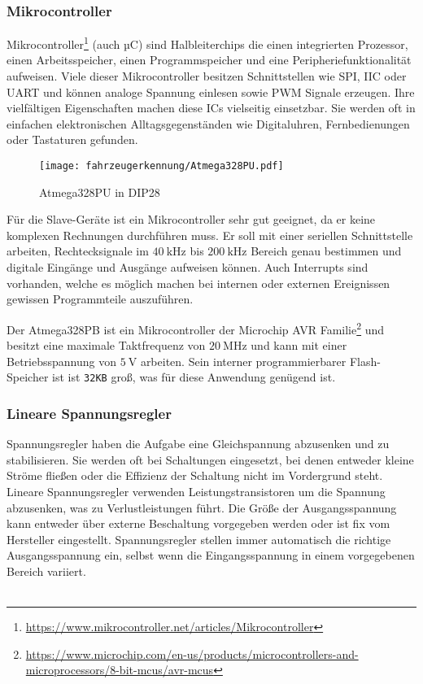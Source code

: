 \subsubsection{Mikrocontroller}

Mikrocontroller\footnote{\url{https://www.mikrocontroller.net/articles/Mikrocontroller}} (auch µC) sind Halbleiterchips die einen integrierten Prozessor, einen Arbeitsspeicher, einen Programmspeicher und eine Peripheriefunktionalität aufweisen. Viele dieser Mikrocontroller besitzen Schnittstellen wie SPI, IIC oder UART
und können analoge Spannung einlesen sowie PWM Signale erzeugen. Ihre vielfältigen Eigenschaften machen diese ICs vielseitig einsetzbar. Sie werden oft in einfachen elektronischen Alltagsgegenständen wie Digitaluhren, Fernbedienungen oder Tastaturen gefunden. 

\begin{figure}[H]
    \centering
    \texttt{[image: fahrzeugerkennung/Atmega328PU.pdf]}
    \caption{Atmega328PU in DIP28}
\end{figure}

Für die Slave-Geräte ist ein Mikrocontroller sehr gut geeignet, da er keine komplexen Rechnungen durchführen muss. Er soll mit einer seriellen Schnittstelle arbeiten, Rechtecksignale im $\SI{40}{\kilo\hertz}$ bis $\SI{200}{\kilo\hertz}$ Bereich genau bestimmen und
digitale Eingänge und Ausgänge aufweisen können. Auch Interrupts sind vorhanden, welche es möglich machen bei internen oder externen Ereignissen gewissen Programmteile auszuführen.



Der Atmega328PB ist ein Mikrocontroller der Microchip AVR Familie\footnote{\url{https://www.microchip.com/en-us/products/microcontrollers-and-microprocessors/8-bit-mcus/avr-mcus}} und besitzt eine maximale Taktfrequenz von $\SI{20}{\mega\hertz}$ und kann mit einer Betriebsspannung von $\SI{5}{\volt}$ arbeiten.
Sein interner programmierbarer Flash-Speicher ist ist \texttt{32KB} groß, was für diese Anwendung genügend ist.

\subsubsection{Lineare Spannungsregler}

Spannungsregler haben die Aufgabe eine Gleichspannung abzusenken und zu stabilisieren. Sie werden oft bei Schaltungen eingesetzt, bei denen entweder kleine Ströme fließen oder die Effizienz der Schaltung nicht im Vordergrund steht.
Lineare Spannungsregler verwenden Leistungstransistoren um die Spannung abzusenken, was zu Verlustleistungen führt. Die Größe der Ausgangsspannung kann entweder über externe Beschaltung vorgegeben werden oder ist fix vom Hersteller eingestellt. Spannungsregler stellen 
immer automatisch die richtige Ausgangsspannung ein, selbst wenn die Eingangsspannung in einem vorgegebenen Bereich variiert. 
\\ \\

